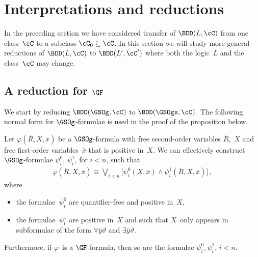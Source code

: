 \documentclass{LMCS}
\begin{document}
\section{Interpretations and reductions}
\label{sect:interpretations}

In the preceding section we have considered transfer of $\BDD(L,\cC)$
from one class~$\cC$ to a subclass $\cC_0 \subseteq \cC$.
In this section we will study more general reductions
of $\BDD(L,\cC)$ to $\BDD(L',\cC')$ where both the logic~$L$
and the class~$\cC$ may change.

\subsection{\boldmath A reduction for $\GF$}
\label{GFredsec}

We start by reducing $\BDD(\GSOg,\cC)$ to $\BDD(\GSOgs,\cC)$.
The following normal form for $\GSOg$-formulae is used in the proof
of the proposition below.
\begin{lem}\label{lem:normal form for GSOg}
Let $\varphi(\bar R,X,\bar x)$ be a $\GSOg$-formula with
free second-order variables $\bar R$,~$X$ and
free first-order variables~$\bar x$ that is positive in~$X$.
We can effectively construct 
$\GSOg$-formulae $\psi^0_i$, $\psi^1_i$, for $i < n$,
such that
\begin{align*}
  \varphi(\bar R,X,\bar x) \equiv \bigvee_{i < n}\bigl[\psi^0_i(X,\bar x) \land \psi^1_i(\bar R,X,\bar x)\bigr]\,,
\end{align*}
where
\begin{itemize}
\item the formulae~$\psi^0_i$ are quantifier-free and positive in~$X$,
\item the formulae~$\psi^1_i$ are positive in~$X$ and such that $X$~only appears in subformulae
  of the form $\forall\bar y\vartheta$ and $\exists\bar y\vartheta$.
\end{itemize}
Furthermore, if $\varphi$~is a $\GF$-formula,
then so are the formulae $\psi^0_i,\psi^1_i$, $i < n$.
\end{lem}
\end{document}
